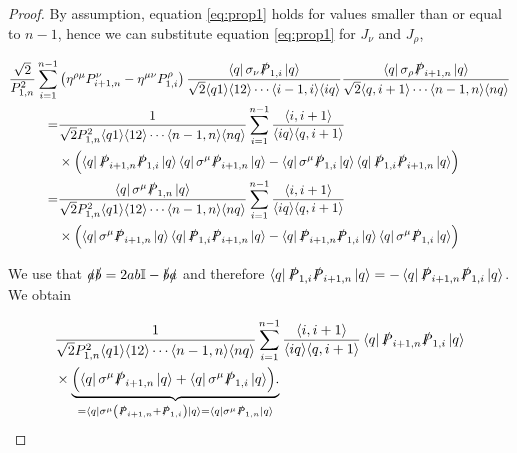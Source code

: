 \documentclass{article}
\theoremstyle{definition}
\numberwithin{equation}{section}
\begin{document}
\begin{proof}
    By assumption, equation \eqref{eq:prop1} holds for values smaller than or equal to $n-1$, hence we can substitute equation \eqref{eq:prop1} for $J_{\nu}$ and $J_{\rho}$,

    \begin{align*}
        \frac{\sqrt{2}}{P_{1,n}^2} \sum_{i=1}^{n-1} &\left( \eta^{\rho \mu} P_{i+1,n}^{\nu} - \eta^{\mu \nu} P_{1,i}^{\rho}  \right) \frac{ \bra{q} \sigma_{\nu} \slashed{P}_{1,i} \ket{q} }{ \sqrt{2} \langle q1 \rangle \langle 12 \rangle \cdots \langle i-1,i \rangle \langle iq \rangle } \frac{ \bra{q} \sigma_{\rho} \slashed{P}_{i+1,n} \ket{q} }{ \sqrt{2} \langle q,i+1 \rangle  \cdots \langle n-1,n \rangle \langle nq \rangle } \\
        = &\frac{1}{ \sqrt{2} P_{1,n}^2 \langle q1 \rangle \langle 12 \rangle \cdots \langle n-1,n \rangle \langle nq \rangle } \sum_{i=1}^{n-1} \frac{ \langle i,i+1 \rangle }{\langle iq \rangle \langle q,i+1 \rangle} \\
        &\times \Bigl( \bra{q} \slashed{P}_{i+1,n} \slashed{P}_{1,i} \ket{q} \bra{q} \sigma^{\mu} \slashed{P}_{i+1,n} \ket{q} - \bra{q} \sigma^{\mu} \slashed{P}_{1,i} \ket{q} \bra{q} \slashed{P}_{1,i} \slashed{P}_{i+1,n} \ket{q} \Bigr) \\
        = &\frac{ \bra{q} \sigma^{\mu} \slashed{P}_{1,n} \ket{q} }{ \sqrt{2} P_{1,n}^2 \langle q1 \rangle \langle 12 \rangle \cdots \langle n-1,n \rangle \langle nq \rangle } \sum_{i=1}^{n-1} \frac{ \langle i,i+1 \rangle }{\langle iq \rangle \langle q,i+1 \rangle} \\
        &\times \Bigl( \bra{q} \sigma^{\mu} \slashed{P}_{i+1,n} \ket{q} \bra{q} \slashed{P}_{1,i} \slashed{P}_{i+1,n} \ket{q} - \bra{q} \slashed{P}_{i+1,n} \slashed{P}_{1,i} \ket{q} \bra{q} \sigma^{\mu} \slashed{P}_{1,i} \ket{q} \Bigr)
    \end{align*}

    We use that $\slashed{a} \slashed{b} = 2 a b \mathbb{I} - \slashed{b} \slashed{a}$ and therefore $\bra{q} \slashed{P}_{1,i} \slashed{P}_{i+1,n} \ket{q} = - \bra{q} \slashed{P}_{i+1,n} \slashed{P}_{1,i} \ket{q}$. We obtain

    \begin{align*}
    &\frac{ 1 }{ \sqrt{2} P_{1,n}^2 \langle q1 \rangle \langle 12 \rangle \cdots \langle n-1,n \rangle \langle nq \rangle } \sum_{i=1}^{n-1} \frac{ \langle i,i+1 \rangle }{\langle iq \rangle \langle q,i+1 \rangle} \bra{q} \slashed{P}_{i+1,n} \slashed{P}_{1,i} \ket{q} \\
    &\times \underbrace{\Bigl( \bra{q} \sigma^{\mu} \slashed{P}_{i+1,n} \ket{q} + \bra{q} \sigma^{\mu} \slashed{P}_{1,i} \ket{q} \Bigr).}_{
        = \bra{q} \sigma^{\mu} \left( \slashed{P}_{i+1,n} + \slashed{P}_{1,i} \right) \ket{q} 
        = \bra{q} \sigma^{\mu} \slashed{P}_{1,n} \ket{q}
    }
    \end{align*}


\end{proof}
\end{document}
